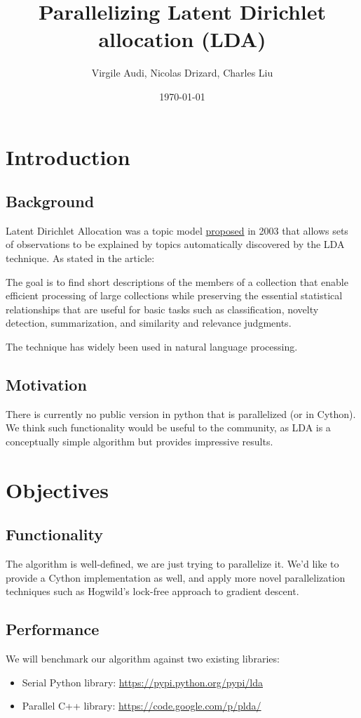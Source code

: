 \documentclass{article}
\title{Parallelizing Latent Dirichlet allocation (LDA)}
\author{Virgile Audi, Nicolas Drizard, Charles Liu}
\date{\today}
\begin{document}
 
\maketitle
 
\section{Introduction}
	\subsection{Background}
		Latent Dirichlet Allocation was a topic model \href{https://www.cs.princeton.edu/~blei/papers/BleiNgJordan2003.pdf}{proposed} in 2003 that allows sets of observations to be explained by topics automatically discovered by the LDA technique. As stated in the article:

		\begin{displayquote}
			The goal is to find short descriptions of the members of a collection that enable efficient
			processing of large collections while preserving the essential statistical relationships that are useful
			for basic tasks such as classification, novelty detection, summarization, and similarity and relevance
			judgments.
		\end{displayquote}

		The technique has widely been used in natural language processing.

	\subsection{Motivation}
		There is currently no public version in python that is parallelized (or in Cython). We think such functionality would be useful to the community, as LDA is a conceptually simple algorithm but provides impressive results.
 
\section{Objectives}
	\subsection{Functionality}
		The algorithm is well-defined, we are just trying to parallelize it. We'd like to provide a Cython implementation as well, and apply more novel parallelization techniques such as Hogwild's lock-free approach to gradient descent.

	\subsection{Performance}
		We will benchmark our algorithm against two existing libraries:
		\begin{itemize}
			\item Serial Python library: \url{https://pypi.python.org/pypi/lda}
			\item Parallel C++ library: \url{https://code.google.com/p/plda/}
		\end{itemize}
\end{document}
